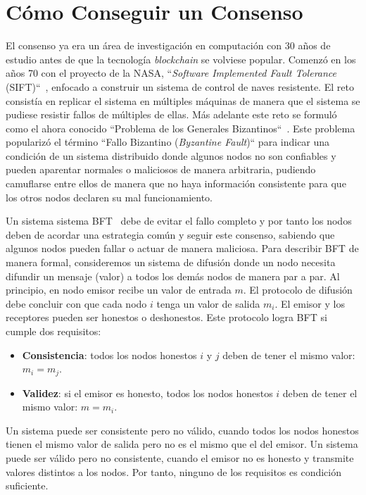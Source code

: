 \section{Cómo Conseguir un Consenso}

El consenso ya era un área de investigación en computación con 30 años de estudio antes de que la tecnología \textit{blockchain} se volviese popular. Comenzó en los años 70 con el proyecto de la NASA, ``\textit{Software Implemented Fault Tolerance} (SIFT)``~\cite{sift}, enfocado a construir un sistema de control de naves resistente. El reto consistía en replicar el sistema en múltiples máquinas de manera que el sistema se pudiese resistir fallos de múltiples de ellas. Más adelante este reto se formuló como el ahora conocido ``Problema de los Generales Bizantinos``~\cite{byzantine-general}. Este problema popularizó el término ``Fallo Bizantino (\textit{Byzantine Fault})`` para indicar una condición de un sistema distribuido donde algunos nodos no son confiables y pueden aparentar normales o maliciosos de manera arbitraria, pudiendo camuflarse entre ellos de manera que no haya información consistente para que los otros nodos declaren su mal funcionamiento.

Un sistema sistema \ac{BFT}~\cite{sift} debe de evitar el fallo completo y por tanto los nodos deben de acordar una estrategia común y seguir este consenso, sabiendo que algunos nodos pueden fallar o actuar de manera maliciosa. Para describir \ac{BFT} de manera formal, consideremos un sistema de difusión donde un nodo necesita difundir un mensaje (valor) a todos los demás nodos de manera par a par. Al principio, en nodo emisor recibe un valor de entrada $m$. El protocolo de difusión debe concluir con que cada nodo $i$ tenga un valor de salida $m_i$. El emisor y los receptores pueden ser honestos o deshonestos. Este protocolo logra \ac{BFT} si cumple dos requisitos:
\begin{itemize}
    \item \textbf{Consistencia}: todos los nodos honestos $i$ y $j$ deben de tener el mismo valor: $m_i=m_j$.
    \item \textbf{Validez}: si el emisor es honesto, todos los nodos honestos $i$ deben de tener el mismo valor: $m=m_i$.
\end{itemize}

Un sistema puede ser consistente pero no válido, cuando todos los nodos honestos tienen el mismo valor de salida pero no es el mismo que el del emisor. Un sistema puede ser válido pero no consistente, cuando el emisor no es honesto y transmite valores distintos a los nodos. Por tanto, ninguno de los requisitos es condición suficiente.

